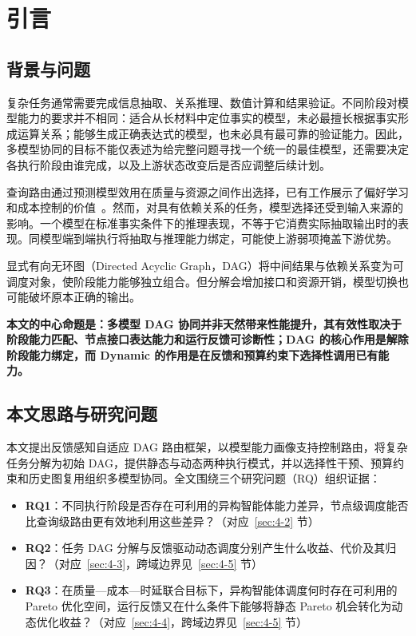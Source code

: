 \documentclass[review,12pt]{elsarticle}
\begin{document}
\section{引言}\label{sec:intro}

\subsection{背景与问题}

复杂任务通常需要完成信息抽取、关系推理、数值计算和结果验证。不同阶段对模型能力的要求并不相同：适合从长材料中定位事实的模型，未必最擅长根据事实形成运算关系；能够生成正确表达式的模型，也未必具有最可靠的验证能力。因此，多模型协同的目标不能仅表述为给完整问题寻找一个统一的最佳模型，还需要决定各执行阶段由谁完成，以及上游状态改变后是否应调整后续计划。

查询路由通过预测模型效用在质量与资源之间作出选择，已有工作展示了偏好学习和成本控制的价值~\cite{ong2024routellm,chen2023frugalgpt}。然而，对具有依赖关系的任务，模型选择还受到输入来源的影响。一个模型在标准事实条件下的推理表现，不等于它消费实际抽取输出时的表现。同模型端到端执行将抽取与推理能力绑定，可能使上游弱项掩盖下游优势。

显式有向无环图（Directed Acyclic Graph，DAG）将中间结果与依赖关系变为可调度对象，使阶段能力能够独立组合。但分解会增加接口和资源开销，模型切换也可能破坏原本正确的输出。

\textbf{本文的中心命题是：多模型 DAG 协同并非天然带来性能提升，其有效性取决于阶段能力匹配、节点接口表达能力和运行反馈可诊断性；DAG 的核心作用是解除阶段能力绑定，而 Dynamic 的作用是在反馈和预算约束下选择性调用已有能力。}

\subsection{本文思路与研究问题}

本文提出反馈感知自适应 DAG 路由框架，以模型能力画像支持控制路由，将复杂任务分解为初始 DAG，提供静态与动态两种执行模式，并以选择性干预、预算约束和历史图复用组织多模型协同。全文围绕三个研究问题（RQ）组织证据：

\begin{itemize}
\item \textbf{RQ1}：不同执行阶段是否存在可利用的异构智能体能力差异，节点级调度能否比查询级路由更有效地利用这些差异？（对应~\ref{sec:4-2} 节）
\item \textbf{RQ2}：任务 DAG 分解与反馈驱动动态调度分别产生什么收益、代价及其归因？（对应~\ref{sec:4-3}，跨域边界见~\ref{sec:4-5} 节）
\item \textbf{RQ3}：在质量—成本—时延联合目标下，异构智能体调度何时存在可利用的 Pareto 优化空间，运行反馈又在什么条件下能够将静态 Pareto 机会转化为动态优化收益？（对应~\ref{sec:4-4}，跨域边界见~\ref{sec:4-5} 节）
\end{itemize}
\end{document}
